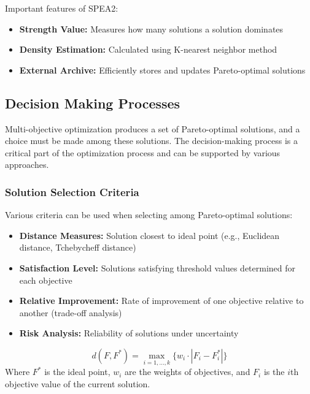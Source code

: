 Important features of SPEA2:
\begin{itemize}
    \item \textbf{Strength Value:} Measures how many solutions a solution dominates
    \item \textbf{Density Estimation:} Calculated using K-nearest neighbor method
    \item \textbf{External Archive:} Efficiently stores and updates Pareto-optimal solutions
\end{itemize}

\subsection{Decision Making Processes}
Multi-objective optimization produces a set of Pareto-optimal solutions, and a choice must be made among these solutions. The decision-making process is a critical part of the optimization process and can be supported by various approaches.

\subsubsection{Solution Selection Criteria}
Various criteria can be used when selecting among Pareto-optimal solutions:
\begin{itemize}
    \item \textbf{Distance Measures:} Solution closest to ideal point (e.g., Euclidean distance, Tchebycheff distance)
    \item \textbf{Satisfaction Level:} Solutions satisfying threshold values determined for each objective
    \item \textbf{Relative Improvement:} Rate of improvement of one objective relative to another (trade-off analysis)
    \item \textbf{Risk Analysis:} Reliability of solutions under uncertainty
\end{itemize}

\begin{tcolorbox}[title=Example: Weighted Tchebycheff Metric]
\begin{equation}
d(F, F^*) = \max_{i=1,...,k} \{w_i \cdot |F_i - F_i^*|\}
\end{equation}
Where $F^*$ is the ideal point, $w_i$ are the weights of objectives, and $F_i$ is the $i$th objective value of the current solution.
\end{tcolorbox}

